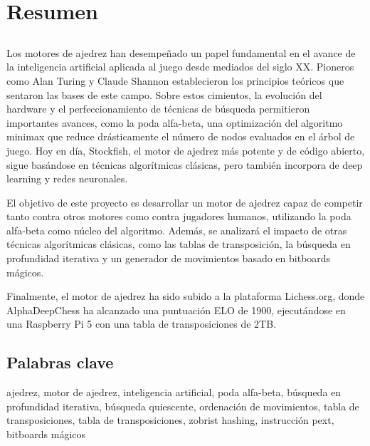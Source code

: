 \chapter*{Resumen}

\section*{\tituloPortadaVal}

Los motores de ajedrez han desempeñado un papel fundamental en el avance de la inteligencia artificial aplicada al juego desde mediados del siglo XX. Pioneros como Alan Turing y Claude Shannon establecieron los principios teóricos que sentaron las bases de este campo. Sobre estos cimientos, la evolución del hardware y el perfeccionamiento de técnicas de búsqueda permitieron importantes avances, como la poda alfa-beta, una optimización del algoritmo minimax que reduce drásticamente el número de nodos evaluados en el árbol de juego. Hoy en día, Stockfish, el motor de ajedrez más potente y de código abierto, sigue basándose en técnicas algorítmicas clásicas, pero también incorpora de deep learning y redes neuronales.

\vspace{1em}

El objetivo de este proyecto es desarrollar un motor de ajedrez capaz de competir tanto contra otros motores como contra jugadores humanos, utilizando la poda alfa-beta como núcleo del algoritmo. Además, se analizará el impacto de otras técnicas algorítmicas clásicas, como las tablas de transposición, la búsqueda en profundidad iterativa y un generador de movimientos basado en bitboards mágicos.

\vspace{1em}

Finalmente, el motor de ajedrez ha sido subido a la plataforma Lichess.org, donde AlphaDeepChess ha alcanzado una puntuación ELO de 1900, ejecutándose en una Raspberry Pi 5 con una tabla de transposiciones de 2TB.

\section*{Palabras clave}
   
\noindent ajedrez, motor de ajedrez, inteligencia artificial, poda alfa-beta, búsqueda en profundidad iterativa, búsqueda quiescente, ordenación de movimientos, tabla de transposiciones, tabla de transposiciones, zobrist hashing, instrucción pext, bitboards mágicos 
   



